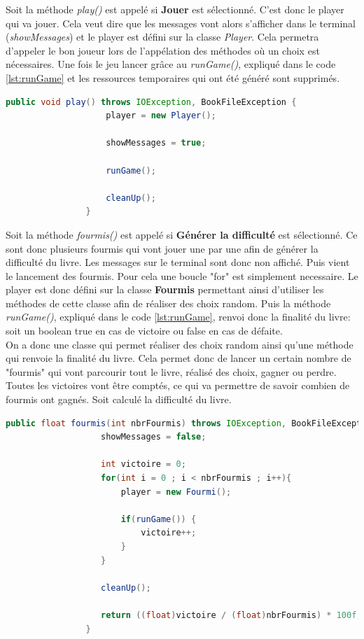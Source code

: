 			Soit la méthode \textit{play()} est appelé si \textbf{Jouer} est sélectionné. C'est donc le player qui va jouer. Cela veut dire que les messages vont alors s'afficher dans le terminal (\textit{showMessages}) et le player est défini sur la classe \textit{Player}. Cela permetra d'appeler le bon joueur lors de l'appélation des méthodes où un choix est nécessaires.
			Une fois le jeu lancer grâce au \textit{runGame()}, expliqué dans le code \ref{lst:runGame} et les ressources temporaires qui ont été généré sont supprimés.

			\begin{lstlisting}[gobble=16, language=java, caption=play()]
				public void play() throws IOException, BookFileException {
					player = new Player();

					showMessages = true;

					runGame();

					cleanUp();
				}
			\end{lstlisting}

			Soit la méthode \textit{fourmis()} est appelé si \textbf{Générer la difficulté} est sélectionné. Ce sont donc plusieurs fourmis qui vont jouer une par une afin de générer la difficulté du livre. Les messages sur le terminal sont donc non affiché. Puis vient le lancement des fourmis. Pour cela une boucle "for" est simplement necessaire. Le player est donc défini sur la classe \textbf{Fourmis} permettant ainsi d'utiliser les méthodes de cette classe afin de réaliser des choix random. Puis la méthode \textit{runGame()}, expliqué dans le code \ref{lst:runGame}, renvoi donc la finalité du livre: soit un boolean true en cas de victoire ou false en cas de défaite.\\
			On a donc une classe qui permet réaliser des choix random ainsi qu'une méthode qui renvoie la finalité du livre. Cela permet donc de lancer un certain nombre de "fourmis" qui vont parcourir tout le livre, réalisé des choix, gagner ou perdre. Toutes les victoires vont être comptés, ce qui va permettre de savoir combien de fourmis ont gagnés. Soit calculé la difficulté du livre.

			\begin{lstlisting}[gobble=16, language=java, caption=fourmis()]
				public float fourmis(int nbrFourmis) throws IOException, BookFileException {
				   showMessages = false;

				   int victoire = 0;
				   for(int i = 0 ; i < nbrFourmis ; i++){
					   player = new Fourmi();

					   if(runGame()) {
						   victoire++;
					   }
				   }

				   cleanUp();

				   return ((float)victoire / (float)nbrFourmis) * 100f;
				}
			\end{lstlisting}


